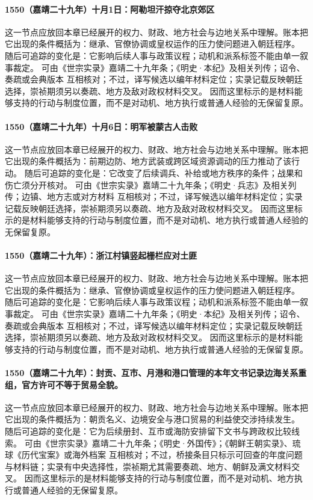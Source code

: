 \paragraph{1550（嘉靖二十九年）十月1日：阿勒坦汗掠夺北京郊区} 这一节点应放回本章已经展开的权力、财政、地方社会与边地关系中理解。账本把它出现的条件概括为：继承、官僚协调或皇权运作的压力使问题进入朝廷程序。 随后可追踪的变化是：它影响后续人事与政策议程；动机和派系标签不能由单一叙事裁定。 可由《世宗实录》嘉靖二十九年条；《明史·本纪》及相关列传；诏令、奏疏或会典版本 互相核对；不过，译写候选以编年材料定位；实录记载反映朝廷选择，崇祯期须另以奏疏、地方及敌对政权材料交叉。 因而这里标示的是材料能够支持的行动与制度位置，而不是对动机、地方执行或普通人经验的无保留复原。

\paragraph{1550（嘉靖二十九年）十月6日：明军被蒙古人击败} 这一节点应放回本章已经展开的权力、财政、地方社会与边地关系中理解。账本把它出现的条件概括为：前期边防、地方武装或跨区域资源调动的压力推动了该行动。 随后可追踪的变化是：它改变了后续调兵、补给或地方秩序的条件；战果和伤亡须分开核对。 可由《世宗实录》嘉靖二十九年条；《明史·兵志》及相关列传；边镇、地方志或对方材料 互相核对；不过，译写候选以编年材料定位；实录记载反映朝廷选择，崇祯期须另以奏疏、地方及敌对政权材料交叉。 因而这里标示的是材料能够支持的行动与制度位置，而不是对动机、地方执行或普通人经验的无保留复原。

\paragraph{1550（嘉靖二十九年）：浙江村镇竖起栅栏应对土匪} 这一节点应放回本章已经展开的权力、财政、地方社会与边地关系中理解。账本把它出现的条件概括为：继承、官僚协调或皇权运作的压力使问题进入朝廷程序。 随后可追踪的变化是：它影响后续人事与政策议程；动机和派系标签不能由单一叙事裁定。 可由《世宗实录》嘉靖二十九年条；《明史·本纪》及相关列传；诏令、奏疏或会典版本 互相核对；不过，译写候选以编年材料定位；实录记载反映朝廷选择，崇祯期须另以奏疏、地方及敌对政权材料交叉。 因而这里标示的是材料能够支持的行动与制度位置，而不是对动机、地方执行或普通人经验的无保留复原。

\paragraph{1550（嘉靖二十九年）：封贡、互市、月港和港口管理的本年文书记录边海关系重组，官方许可不等于贸易全貌。} 这一节点应放回本章已经展开的权力、财政、地方社会与边地关系中理解。账本把它出现的条件概括为：朝贡名义、边境安全与港口贸易的利益使交涉持续发生。 随后可追踪的变化是：它为后续册封、互市或海防安排留下文书与跨政权比较线索。 可由《世宗实录》嘉靖二十九年条；《明史·外国传》；《朝鲜王朝实录》、琉球《历代宝案》或海外档案 互相核对；不过，桥接条目只标示可回查的年度问题与材料链；实录有中央选择性，崇祯期尤其需要奏疏、地方、朝鲜及满文材料交叉。 因而这里标示的是材料能够支持的行动与制度位置，而不是对动机、地方执行或普通人经验的无保留复原。

